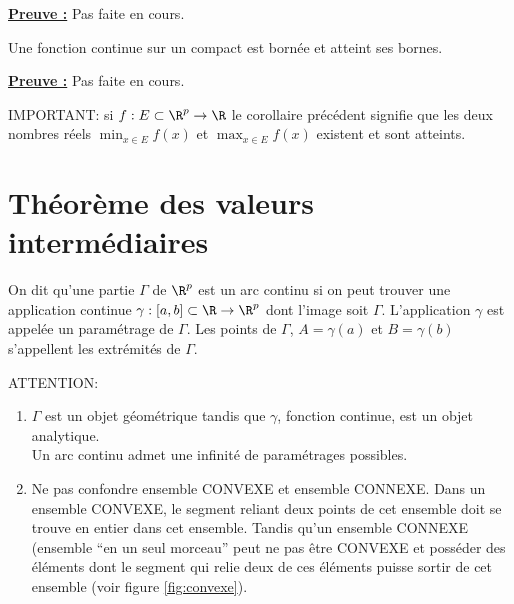 \documentclass[class=report,crop=false]{standalone}
\begin{document}
\noindent \underline{\bf Preuve :}
Pas faite en cours.



\begin{corollaire}
\textcolor[rgb]{0.50,0.00,0.25}{
Une fonction continue sur un compact est bornée et atteint ses bornes.
}
\end{corollaire}

\noindent \underline{\bf Preuve :}
Pas faite en cours.

\begin{remarque*}
\textcolor[rgb]{0.00,0.00,1.00}{
\noindent 
IMPORTANT: si $f:  E \subset \R^p \rightarrow \R$ le corollaire précédent signifie que les deux nombres 
réels $\displaystyle \min_{x \in E} f(x)$ et $\displaystyle \max_{x \in E} f(x)$ existent 
et sont atteints.
}
\end{remarque*}

\section{Théorème des valeurs intermédiaires}

\begin{definition}
\textcolor[rgb]{0.73,0.00,0.00}{
\noindent On dit qu'une partie $\Gamma$ de $\R^p$ est un arc continu si on peut trouver
une application continue $\gamma: [a,b] \subset \R \rightarrow \R^p$ dont l'image soit $\Gamma$.
L'application $\gamma$ est appelée un paramétrage de $\Gamma$. Les points de $\Gamma$, 
$A=\gamma(a)$ et $B=\gamma(b)$ s'appellent les extrémités de $\Gamma$.
}
\end{definition}


\begin{remarque*}
\textcolor[rgb]{0.00,0.00,1.00}{
\noindent 
ATTENTION: 
\begin{enumerate}
\item $\Gamma$ est un objet géométrique tandis que $\gamma$, fonction
continue, est un objet analytique. \\
Un arc continu admet une infinité de paramétrages possibles.
\item Ne pas confondre ensemble CONVEXE et ensemble CONNEXE. Dans un ensemble CONVEXE, le segment reliant deux points de cet ensemble doit se trouve en entier dans cet ensemble. Tandis qu'un ensemble CONNEXE (ensemble ``en un seul morceau'' peut ne pas être CONVEXE et posséder des éléments dont le segment qui relie deux de ces éléments puisse sortir de cet ensemble (voir figure \ref{fig:convexe}).
\end{enumerate}
}
\end{remarque*}
\end{document}
